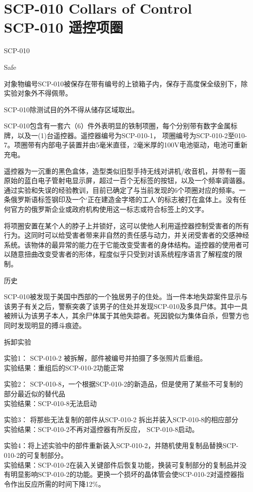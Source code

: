 \chapter[SCP-010 遥控项圈]{
	SCP-010 Collars of Control\\
	SCP-010 遥控项圈
}

\label{chap:SCP-010}

SCP-010

Safe

对象物编号SCP-010被保存在带有编号的上锁箱子内，保存于高度保全级别下，除实验对象外不得佩带。

SCP-010除测试目的外不得从储存区域取出。

SCP-010包含有一套六（6）件外表明显的铁制项圈，每个分别带有数字金属标牌，以及一(1)台遥控器。遥控器编号为SCP-010-1， 项圈编号为SCP-010-2至010-7。项圈带有内部电子装置并由5毫米直径，2毫米厚的100V电池驱动，电池可重新充电。

遥控器为一沉重的黑色盒体，造型类似旧型手持无线对讲机/收音机，并带有一面原始的蓝白电子管射电显示屏，超过一百个无标签的按钮，以及一个频率调谐器。通过实验和失误的经验教训，目前已确定了与当前发现的6个项圈对应的频率。一条俄罗斯语标签钢印及一个‘正在建造金字塔的工人’的标志被打在盒体上。没有任何官方的俄罗斯企业或政府机构使用这一标志或符合标签上的文字。

将项圈安置在某个人的脖子上并锁好，这可以使他人利用遥控器控制受害者的所有行为。这同时可以给受害者带来非自然的责任感与动力，并关闭受害者的交感神经系统。该物体的最异常的能力在于它能改变受害者的身体结构。遥控器的使用者可以随意扭曲改变受害者的形体，程度似乎只受到对该系统程序语言了解程度的限制。

历史

SCP-010被发现于美国中西部的一个独居男子的住处。当一件本地失踪案件显示与该男子有关之后，警察突袭了该男子的住处并发现SCP-010及多具尸体。其中一具被辨认为该男子本人，其余尸体属于其他失踪者。死因貌似为集体自杀，但警方也同时发现明显的搏斗痕迹。

拆卸实验

实验1： SCP-010-2 被拆解，部件被编号并拍摄了多张照片后重组。\\
实验结果：重组后的SCP-010-2功能正常

实验2： SCP-010-8，一个根据SCP-010-2的新造品，但是使用了某些不可复制的部分最近似的替代品\\
实验结果：SCP-010-8无法启动

实验3： 将那些无法复制的部件从SCP-010-2 拆出并装入SCP-010-8的相应部分\\
实验结果：SCP-010-2不再对遥控器有所反应， SCP-010-8启动。

实验4：将上述实验中的部件重新装入SCP-010-2，并随机使用复制品替换SCP-010-2的可复制部分。\\
实验结果：SCP-010-2在装入关键部件后恢复功能，换装可复制部分的复制品并没有明显影响SCP-010-2的功能。更换一个损坏的晶体管会使SCP-010-2对遥控器指令作出反应所需的时间下降12\%。


